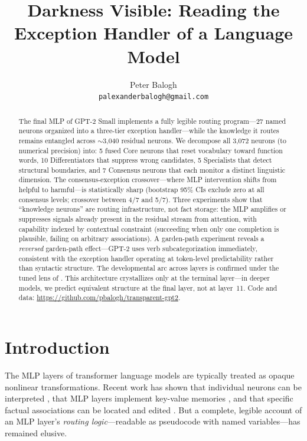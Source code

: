 \documentclass{article}
\title{Darkness Visible: Reading the Exception Handler of a Language Model}
\author{
  Peter Balogh \\
  \texttt{palexanderbalogh@gmail.com}
}
\begin{document}
\maketitle

\begin{abstract}
The final MLP of GPT-2 Small implements a fully legible routing
program---27 named neurons organized into a three-tier exception handler---while
the knowledge it routes remains entangled across $\sim$3{,}040 residual neurons.
We decompose all 3{,}072 neurons (to numerical precision) into:
5 fused Core neurons that reset vocabulary toward function words,
10 Differentiators that suppress wrong candidates,
5 Specialists that detect structural boundaries, and
7 Consensus neurons that each monitor a distinct linguistic dimension.
The consensus-exception crossover---where MLP intervention shifts from helpful
to harmful---is statistically sharp (bootstrap 95\% CIs exclude zero at
all consensus levels; crossover between 4/7 and 5/7).
Three experiments show that ``knowledge neurons'' \citep{dai2022knowledge} are
routing infrastructure, not fact storage: the MLP amplifies or suppresses
signals already present in the residual stream from attention, with capability
indexed by contextual constraint (succeeding when only one completion is
plausible, failing on arbitrary associations).
A garden-path experiment reveals a \emph{reversed} garden-path effect---GPT-2
uses verb subcategorization immediately, consistent with the exception handler operating at token-level predictability
rather than syntactic structure.
The developmental arc across layers is confirmed under the tuned lens of
\citet{belrose2023eliciting}.
This architecture crystallizes only at the terminal layer---in deeper models,
we predict equivalent structure at the final layer, not at layer~11.
Code and data: \url{https://github.com/pbalogh/transparent-gpt2}.
\end{abstract}

\section{Introduction}

The MLP layers of transformer language models are typically treated as opaque
nonlinear transformations.
Recent work has shown that individual neurons can be interpreted
\citep{gurnee2023finding, bricken2023monosemanticity}, that MLP layers implement
key-value memories \citep{geva2021transformer}, and that specific factual
associations can be located and edited \citep{meng2022locating}.
But a complete, legible account of an MLP layer's \emph{routing logic}---readable
as pseudocode with named variables---has remained elusive.
\end{document}
